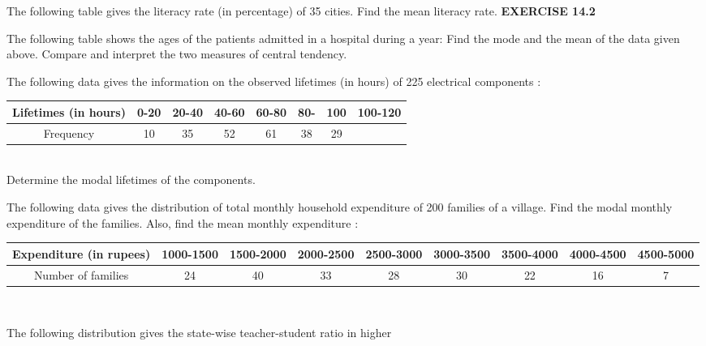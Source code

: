\item The following table gives the literacy rate (in percentage) of 35 cities. Find the mean
literacy rate.
{\Large \textbf{EXERCISE 14.2}}\\
\item The following table shows the ages of the patients admitted in a hospital during a year:
Find the mode and the mean of the data given above. Compare and interpret the two
measures of central tendency.
\item The following data gives the information on the observed lifetimes (in hours) of 225
electrical components :
\begin{tabular}{|c|c|c|c|c|c|c|c|}
\hline
Lifetimes (in hours)&0-20&20-40&40-60&60-80&80-&100&100-120\\
\hline
Frequency&10&35&52&61&38&29\\
\hline
\end{tabular}\\
Determine the modal lifetimes of the components.
\item The following data gives the distribution of total monthly household expenditure of 200
families of a village. Find the modal monthly expenditure of the families. Also, find the
mean monthly expenditure :
\begin{tabular}{|c|c|c|c|c|c|c|c|c|}
\hline
Expenditure (in rupees)&1000-1500&1500-2000&2000-2500&2500-3000&3000-3500&3500-4000&4000-4500& 4500-5000\\
\hline
Number of families&24&40&33&28&30&22&16&7\\
\hline
\end{tabular}\\
\item The following distribution gives the state-wise teacher-student ratio in higher
